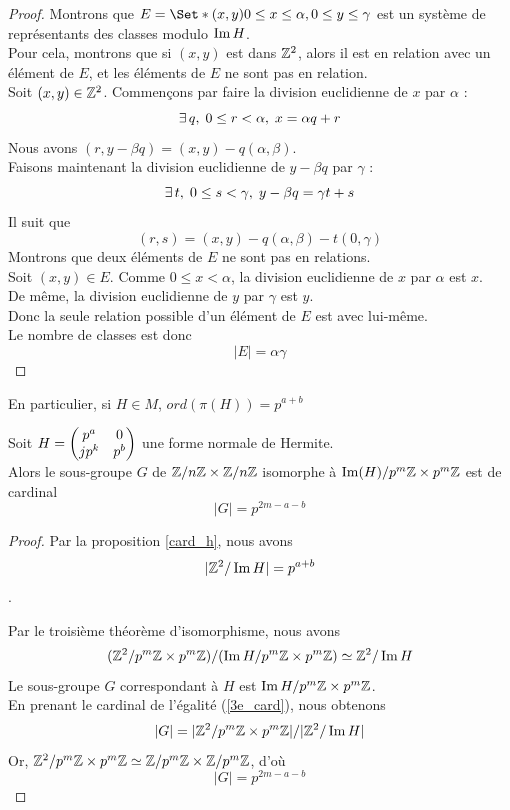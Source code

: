 \documentclass[12pt]{article}
\newcommand*{\pmZpmZ }{p^m\Z \x p^m\Z}
\newcommand*{\ZZpmZ}{\Z^2/\pmZpmZ}
\newcommand{\ZpmZ}{\Z/p^m\Z}
\newcommand{\ZZpm}{\ZpmZ \x \ZpmZ}
\begin{document}
\begin{proof}
	Montrons que $E = \Set*{(x,y)}{0 \le x \le \alpha, 0 \le y \le \gamma}$ est un système de représentants
	des classes modulo $\operatorname{Im} H$.\\
	Pour cela, montrons que si $(x,y)$ est dans $\mathbb Z^2$, alors il est en relation
	avec un élément de $E$, et les éléments de $E$ ne sont pas en relation.\\
	Soit $(x,y) \in \mathbb Z^2$. Commençons par faire la division euclidienne de $x$ par $\alpha$ :\\
	$$ \exists \, q , \; 0 \le r < \alpha , \; x = \alpha q + r$$
	Nous avons $(r,y - \beta q) = (x,y) - q(\alpha, \beta)$.\\
	Faisons maintenant la division euclidienne de $y - \beta q $ par $\gamma$ :
	$$\exists \, t , \; 0 \le s < \gamma , \; y - \beta q = \gamma t + s$$
	Il suit que
	$$(r,s) = (x,y)- q(\alpha, \beta) - t(0, \gamma)$$
	Montrons que deux éléments de $E$ ne sont pas en relations.\\
	Soit $(x,y) \in E$. Comme $0 \le x < \alpha$, la division euclidienne de $x$ par $\alpha$ est $x$.\\
	De même, la division euclidienne de $y$ par $\gamma$ est $y$.\\
	Donc la seule relation possible d'un élément de $E$ est avec lui-même.\\
	Le nombre de classes est donc
	$$ |E| = \alpha \gamma$$

\end{proof}

\begin{remark}
	En particulier, si $H \in M$, $ord(\pi(H)) = p^{a+b}$
\end{remark}

\begin{proposition}
	Soit $H = \begin{pmatrix} p^a & 0\\ jp^k & p^b \end{pmatrix}$ une forme normale de Hermite.\\
	Alors le sous-groupe $G$ de $\mathbb Z/n\mathbb Z \times \mathbb Z/n\mathbb Z$ isomorphe à $\im(H)/\pmZpmZ$ est de cardinal
	$$|G|= p^{2m - a - b}$$
\end{proposition}

\begin{proof}
	Par la proposition \ref{card_h}, nous avons
	$$|\mathbb Z^2/\operatorname{Im} H| = p^{a+b}$$.


	Par le troisième théorème d'isomorphisme, nous avons
	\begin{equation}\label{3e_card}
		(\Z^2/\pmZpmZ)/(\im H/\pmZpmZ) \isom \Z^2/\im H
	\end{equation}
	Le sous-groupe $G$ correspondant à $H$ est $\im H/\pmZpmZ$.\\
	En prenant le cardinal de l'égalité (\ref{3e_card}), nous obtenons
	\begin{equation*}
		|G| = |\Z^2/\pmZpmZ|/|\Z^2/\im H |
	\end{equation*}
	Or, $\ZZpmZ \isom \ZZpm$, d'où
	$$|G| = p^{2m - a - b}$$
\end{proof}
\newpage
\end{document}
